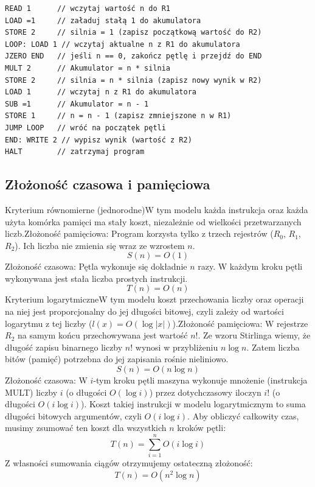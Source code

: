 \documentclass[en, color=black, device=pad, mode=geey]{elegantnote}
\begin{document}
        \begin{lstlisting}
READ 1      // wczytaj wartość n do R1
LOAD =1     // załaduj stałą 1 do akumulatora
STORE 2     // silnia = 1 (zapisz początkową wartość do R2)
LOOP: LOAD 1 // wczytaj aktualne n z R1 do akumulatora
JZERO END   // jeśli n == 0, zakończ pętlę i przejdź do END
MULT 2      // Akumulator = n * silnia
STORE 2     // silnia = n * silnia (zapisz nowy wynik w R2)
LOAD 1      // wczytaj n z R1 do akumulatora
SUB =1      // Akumulator = n - 1
STORE 1     // n = n - 1 (zapisz zmniejszone n w R1)
JUMP LOOP   // wróć na początek pętli
END: WRITE 2 // wypisz wynik (wartość z R2)
HALT        // zatrzymaj program
\end{lstlisting}

        \newpage
        \subsection{Złożoność czasowa i pamięciowa}
        Kryterium równomierne (jednorodne)W tym modelu każda instrukcja oraz każda użyta komórka pamięci ma stały koszt, niezależnie od wielkości przetwarzanych liczb.Złożoność pamięciowa: Program korzysta tylko z trzech rejestrów ($R_0$, $R_1$, $R_2$). Ich liczba nie zmienia się wraz ze wzrostem $n$.$$S(n) = O(1)$$Złożoność czasowa: Pętla wykonuje się dokładnie $n$ razy. W każdym kroku pętli wykonywana jest stała liczba prostych instrukcji.$$T(n) = O(n)$$Kryterium logarytmiczneW tym modelu koszt przechowania liczby oraz operacji na niej jest proporcjonalny do jej długości bitowej, czyli zależy od wartości logarytmu z tej liczby ($l(x) = O(\log |x|)$).Złożoność pamięciowa: W rejestrze $R_2$ na samym końcu przechowywana jest wartość $n!$. Ze wzoru Stirlinga wiemy, że długość zapisu binarnego liczby $n!$ wynosi w przybliżeniu $n \log n$. Zatem liczba bitów (pamięć) potrzebna do jej zapisania rośnie nieliniowo.$$S(n) = O(n \log n)$$Złożoność czasowa: W $i$-tym kroku pętli maszyna wykonuje mnożenie (instrukcja MULT) liczby $i$ (o długości $O(\log i)$) przez dotychczasowy iloczyn $i!$ (o długości $O(i \log i)$). Koszt takiej instrukcji w modelu logarytmicznym to suma długości bitowych argumentów, czyli $O(i \log i)$. Aby obliczyć całkowity czas, musimy zsumować ten koszt dla wszystkich $n$ kroków pętli:$$T(n) = \sum_{i=1}^{n} O(i \log i)$$Z własności sumowania ciągów otrzymujemy ostateczną złożoność:$$T(n) = O(n^2 \log n)$$
\end{document}
